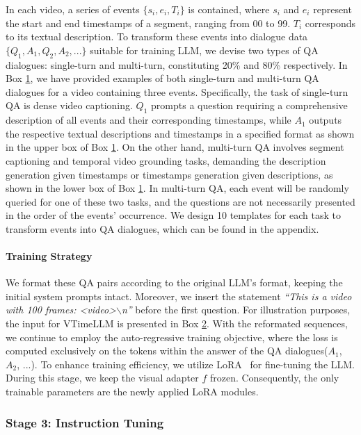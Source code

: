 \documentclass[10pt,twocolumn,letterpaper]{article}
\begin{document}
In each video, a series of events $\{s_i, e_i, T_i\}$ is contained, where $s_i$ and $e_i$ represent the start and end timestamps of a segment, ranging from 00 to 99. $T_i$ corresponds to its textual description. To transform these events into dialogue data $\{Q_1, A_1, Q_2, A_2,...\}$ suitable for training LLM, we devise two types of QA dialogues: single-turn and multi-turn, constituting 20\% and 80\% respectively. In Box \hyperlink{box1}{1}, we have provided examples of both single-turn and multi-turn QA dialogues for a video containing three events. Specifically, the task of single-turn QA is dense video captioning. $Q_1$ prompts a question requiring a comprehensive description of all events and their corresponding timestamps, while $A_1$ outputs the respective textual descriptions and timestamps in a specified format as shown in the upper box of Box \hyperlink{box1}{1}. On the other hand, multi-turn QA involves segment captioning and temporal video grounding tasks, demanding the description generation given timestamps or timestamps generation given descriptions, as shown in the lower box of Box \hyperlink{box1}{1}. In multi-turn QA, each event will be randomly queried for one of these two tasks, and the questions are not necessarily presented in the order of the events' occurrence. We design 10 templates for each task to transform events into QA dialogues, which can be found in the appendix.


\paragraph{Training Strategy} We format these QA pairs according to the original LLM's format, keeping the initial system prompts intact. Moreover, we insert the statement \textit{``This is a video with 100 frames: \textless video\textgreater$\backslash$n''} before the first question. For illustration purposes, the input for VTimeLLM is presented in Box \hyperlink{box2}{2}. With the reformated sequences, we continue to employ the auto-regressive training objective, where the loss is computed exclusively on the tokens within the answer of the QA dialogues($A_1$, $A_2$, ...). To enhance training efficiency, we utilize LoRA~\cite{hu2021lora} for fine-tuning the LLM. During this stage, we keep the visual adapter $f$ frozen. Consequently, the only trainable parameters are the newly applied LoRA modules.

\subsubsection{Stage 3: Instruction Tuning}
\end{document}
